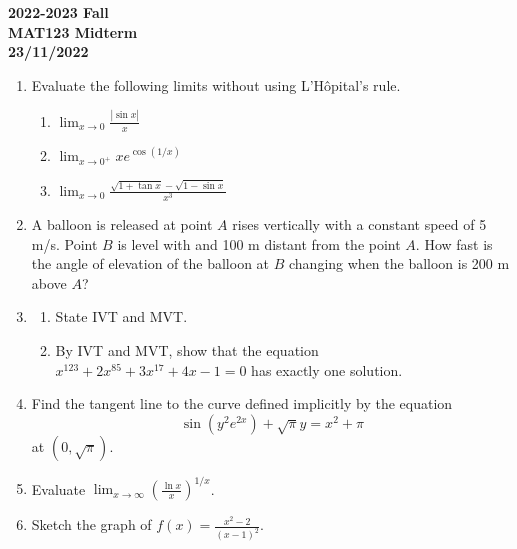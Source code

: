 \documentclass[a4paper, 12pt]{article}
\begin{document}
\newpage
{}
{}


\begin{center}
\textbf{2022-2023 Fall\\MAT123 Midterm\\23/11/2022}
\end{center}

\begin{enumerate}[leftmargin=*,label=\textbf{\arabic*.}]
\item Evaluate the following limits without using L'Hôpital's rule.

\begin{enumerate}[leftmargin=*,label=\textbf{\alph*.}]
\item $\displaystyle \lim_{x\to 0} \frac{\left|\sin x\right|}{x}$
\item $\displaystyle \lim_{x\to 0^+}x e^{\displaystyle \cos(1/x)}$
\item $\displaystyle \lim_{x\to 0}{\frac{\sqrt{1+\tan x} -\sqrt{1-\sin x} }{x^3}}$
\end{enumerate}

\item A balloon is released at point $A$ rises vertically with a constant speed of 5 m/s. Point $B$ is level with and 100 m distant from the point $A$. How fast is the angle of elevation of the balloon at $B$ changing when the balloon is 200 m above $A$?

\item
\begin{enumerate}[leftmargin=*,label=\textbf{\alph*.}]
\item State IVT and MVT.

\item By IVT and MVT, show that the equation $x^{123}+2x^{85} + 3x^{17} + 4x-1 = 0$ has exactly one solution.
\end{enumerate}

\item Find the tangent line to the curve defined implicitly by the equation
\[\sin\left(y^2 e^{2x}\right)+\sqrt{\pi}y=x^2+\pi\]
at $\left(0, \sqrt\pi\right).$

\item Evaluate $\displaystyle \lim_{x \to \infty} \left(\frac{\ln x}{x}\right)^{1/x}$.

\item Sketch the graph of $\displaystyle f(x) = \frac{x^2-2}{(x-1)^2}$.
\end{enumerate}
\end{document}

